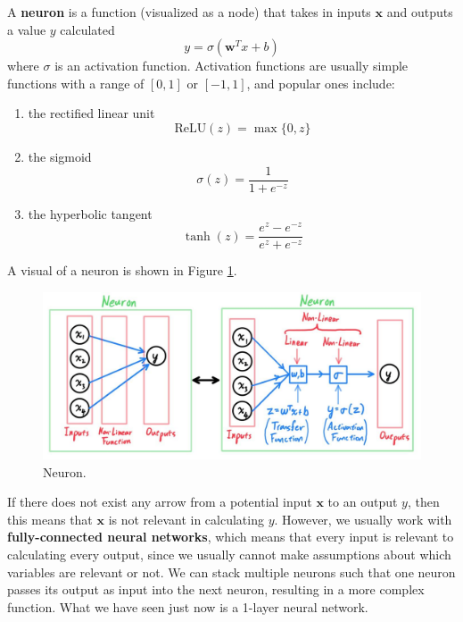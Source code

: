 \documentclass{article}
\begin{document}
    \begin{definition}[Neuron]
      A \textbf{neuron} is a function (visualized as a node) that takes in inputs $\mathbf{x}$ and outputs a value $y$ calculated 
        \[y = \sigma(\mathbf{w}^T x  + b)\]
      where $\sigma$ is an activation function. Activation functions are usually simple functions with a range of $[0, 1]$ or $[-1, 1]$, and popular ones include: 
      \begin{enumerate}
        \item the rectified linear unit 
          \[\mathrm{ReLU}(z) = \max\{0 , z\}\]
        \item the sigmoid 
          \[\sigma(z) = \frac{1}{1 + e^{-z}}\]
        \item the hyperbolic tangent 
          \[\tanh(z) = \frac{e^{z} - e^{-z}}{e^z + e^{-z}}\]
      \end{enumerate}
      A visual of a neuron is shown in Figure \ref{fig:neuron}. 
      \begin{figure}[H]
        \centering 
          \includegraphics[scale=0.25]{img/01_MLP/Neuron.jpg}
        \caption{Neuron. } 
        \label{fig:neuron}
      \end{figure}
    \end{definition}

    If there does not exist any arrow from a potential input $\mathbf{x}$ to an output $y$, then this means that $\mathbf{x}$ is not relevant in calculating $y$. However, we usually work with \textbf{fully-connected neural networks}, which means that every input is relevant to calculating every output, since we usually cannot make assumptions about which variables are relevant or not. We can stack multiple neurons such that one neuron passes its output as input into the next neuron, resulting in a more complex function. What we have seen just now is a 1-layer neural network. 
\end{document}
